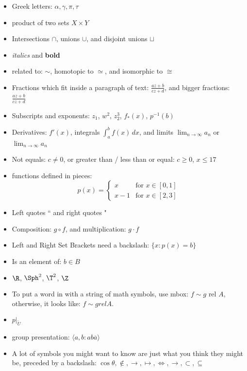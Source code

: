 \documentclass[12pt]{article}   %
\begin{document}
\begin{itemize}     %
\item Greek letters:  $\alpha, \gamma, \pi, \tau$
\item product of two sets $X \times Y$
\item Intersections $\cap$, unions $\cup$, and disjoint unions $\sqcup$
\item {\it italics} and {\bf bold}
\item related to: $\sim$, homotopic to $\simeq$, and isomorphic to $\cong$
\item Fractions which fit inside a paragraph of text:
$\frac{az + b}{cz + d}$,
and bigger fractions: $\displaystyle{\frac{az + b}{cz + d}}$
\item Subscripts and exponents:  $z_1$, $w^2$, $z_2^3$, $f_*(x)$,  $p^{-1}(b)$
\item Derivatives: $f'(x)$, integrals $\int_a^b f(x) \, dx$, %
and limits $\lim_{n \rightarrow \infty} a_n$ or $\displaystyle{\lim_{n \rightarrow \infty} a_n}$
\item Not equals:  $c \neq 0$, or greater than / less than or equal: $c \ge 0$, $x \le 17$
\item functions defined in pieces:  $$p(x) =  \left\{ \begin{array}{ll}
                x & \mbox{for } x \in [0,1] \\
                x-1 & \mbox{for } x \in [2,3]
                \end{array} \right.$$
\item Left quotes `` and right quotes "
\item Composition:  $g \circ f$, and multiplication:  $g \cdot f$
\item Left and Right Set Brackets need a backslash:  $\{x : p(x) = b\}$
\item Is an element of: $b \in B$
\item $\R$,  $\Sph^2$, $\T^2$, $\Z$
\item To put a word in with a string of math symbols, use mbox:  $f \sim g \mbox{ rel } A$,
otherwise, it looks like: $f \sim g rel A$.
\item $p|_{\widetilde{U}}$
\item group presentation:  $\langle a,b : ab\overline{a} \rangle$
\item A lot of symbols you might want to know are just what you think
they might be, preceded by a backslash:  $\cos \theta, \not\in, \rightarrow, \mapsto,
\Leftrightarrow, \longrightarrow, \subset, \subseteq$
\end{itemize}
\end{document}
